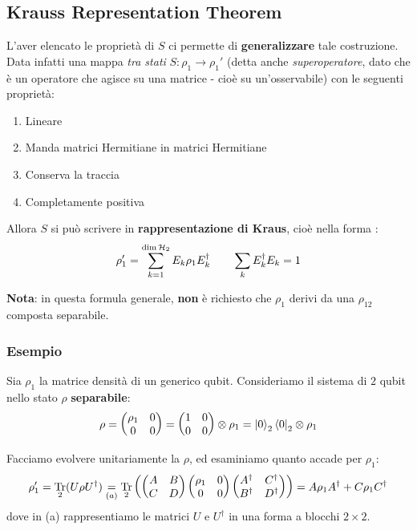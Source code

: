 \documentclass[../../InformazioneQuantistica.tex]{subfiles}
\begin{document}
\subsection{Krauss Representation Theorem}
L'aver elencato le proprietà di $S$ ci permette di \textbf{generalizzare} tale costruzione.\\
Data infatti una mappa \textit{tra stati} $S: \rho_1 \to \rho_1'$ (detta anche \textit{superoperatore}, dato che è un operatore che agisce su una matrice - cioè su un'osservabile) con le seguenti proprietà:
\begin{enumerate}
\item Lineare
\item Manda matrici Hermitiane in matrici Hermitiane
\item Conserva la traccia
\item Completamente positiva
\end{enumerate}
Allora $S$ si può scrivere in \textbf{rappresentazione di Kraus}, cioè nella forma :
\begin{align*}
\rho_1' = \sum_{k=1}^{\operatorname{dim}\mathcal{H}_2} E_k \rho_1 E_k^\dag \qquad \sum_{k}E_k^\dag E_k = 1
\end{align*}

\textbf{Nota}: in questa formula generale, \textbf{non} è richiesto che $\rho_1$ derivi da una $\rho_{12}$ composta separabile.

\subsubsection{Esempio}
Sia $\rho_1$ la matrice densità di un generico qubit. Consideriamo il sistema di $2$ qubit nello stato $\rho$ \textbf{separabile}:
\begin{align*}
\rho = \begin{pmatrix} \rho_1 & 0 \\ 0 & 0\end{pmatrix} = \begin{pmatrix}1 & 0\\ 0 & 0 \end{pmatrix} \otimes \rho_1 = \Ket{0}_2\Bra{0}_2 \otimes \rho_1
\end{align*}

Facciamo evolvere unitariamente la $\rho$, ed esaminiamo quanto accade per $\rho_1$:
\begin{align*}
\rho_1' = \underset{2}{\operatorname{Tr}}(U\rho U^\dag) \underset{(a)}{=} \underset{2}{\operatorname{Tr}} \left(\begin{pmatrix}A & B\\ C & D \end{pmatrix} \begin{pmatrix} \rho_1 & 0\\ 0 & 0 \end{pmatrix}\begin{pmatrix} A^\dag & C^\dag\\ B^\dag & D^\dag \end{pmatrix}\right) = A \rho_1 A^\dag + C \rho_1 C^\dag
\end{align*}
dove in (a) rappresentiamo le matrici $U$ e $U^\dag$ in una forma a blocchi $2\times 2$.\\
\end{document}
